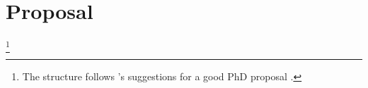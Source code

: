 
\chapter[Proposal]{Proposal} \label{chap:proposal-phd}
\footnote{The structure follows \citeauthor{Schmitter2002}'s suggestions for a good PhD proposal \citeyearpar{Schmitter2002}.
    }






